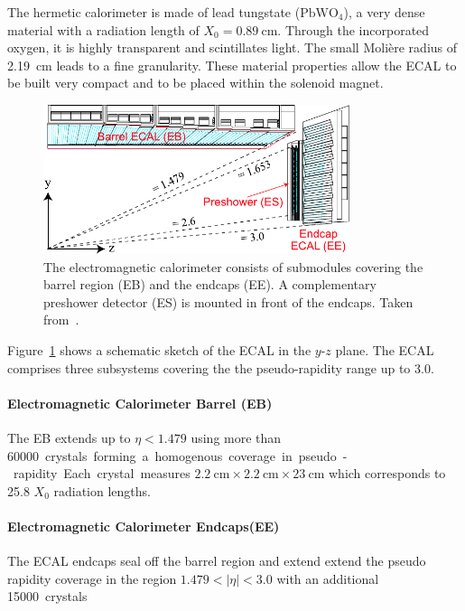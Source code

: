 The hermetic calorimeter is made of lead tungstate ($\mathrm{PbWO}_4$), a very
dense material with a radiation length of $X_0 = \SI{0.89}{\centi\meter}$.
Through the incorporated oxygen, it is highly transparent and scintillates
light.  The small Moli\`ere  radius of \SI{2.19}{\centi\meter} leads to a fine
granularity.  These material properties allow the ECAL to be built very compact
and to be placed within the solenoid magnet. 

\begin{figure}[htp]
    \centering
    \includegraphics[width=0.8\textwidth]{figures/cms_detector/cms_ecal.pdf}\hfill
    \caption[Electromagnetic Calorimeter]{The electromagnetic calorimeter
    consists of submodules covering the barrel region (EB) and the endcaps (EE).
    A complementary preshower detector (ES) is mounted in front of the
    endcaps. Taken from~\cite{cms:ecal}.}
    \label{fig:cms:ecal}
\end{figure}

Figure~\ref{fig:cms:ecal} shows a schematic sketch of the ECAL in the $y$-$z$
plane. The ECAL comprises three subsystems covering the the pseudo-rapidity
range up to 3.0. 

\paragraph{Electromagnetic Calorimeter Barrel (EB)} 
The EB extends up to $\eta < 1.479$ using more than \SI{60000} crystals forming a
homogenous coverage in pseudo-rapidity. Each crystal measures
$\SI{2.2}{\centi\meter} \times \SI{2.2}{\centi\meter} \times
\SI{23}{\centi\meter}$ which corresponds to 25.8 $X_0$ radiation lengths.

\paragraph{Electromagnetic Calorimeter Endcaps(EE)} 
The ECAL endcaps seal off the barrel region and extend extend the pseudo rapidity
coverage in the region $1.479 < |\eta| < 3.0$ with an additional \SI{15000}
crystals

